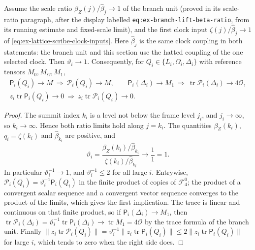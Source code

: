 \begin{lemma}
\label{lem:ex-lattice-scribe-normalization-ratio}
Assume the scale ratio $\beta_Z(j)/\widehat\beta_j\to1$ of the branch
unit (proved in its scale-ratio paragraph, after the display labelled
\texttt{eq:ex-branch-lift-beta-ratio}, from its running estimate and
fixed-scale limit), and the first clock input
$\zeta(j)/\widehat\beta_j\to1$ of
\eqref{eq:ex-lattice-scribe-clock-inputs}. Here $\widehat\beta_j$ is the
same clock coupling in both statements: the branch unit and this section
use the hatted coupling of the one selected clock. Then $\vartheta_i\to1$.
Consequently, for $Q_i\in\{L_i,\Omega_i,\Delta_i\}$ with reference
tensors $M_0,M_\Omega,M_1$,
\begin{gather*}
 \mathsf P_i(Q_i)\to M\ \Longrightarrow\ \mathcal P_i(Q_i)\to M,
 \qquad
 \mathsf P_i(\Delta_i)\to M_1\ \Longrightarrow\
 \operatorname{tr}\mathcal P_i(\Delta_i)\to4\mathcal O,\\
 z_i\operatorname{tr}\mathsf P_i(Q_i)\to0\ \Longrightarrow\
 z_i\operatorname{tr}\mathcal P_i(Q_i)\to0 .
\end{gather*}
\end{lemma}
\begin{proof}
The summit index $k_i$ is a level not below the frame level $j_i$, and
$j_i\to\infty$, so $k_i\to\infty$. Hence both ratio limits hold along
$j=k_i$. The quantities $\beta_Z(k_i)$, $q_i=\zeta(k_i)$ and
$\widehat\beta_{k_i}$ are positive, and
\[
 \vartheta_i=\frac{\beta_Z(k_i)/\widehat\beta_{k_i}}
               {\zeta(k_i)/\widehat\beta_{k_i}}
 \longrightarrow\frac11=1 .
\]
In particular $\vartheta_i^{-1}\to1$, and $\vartheta_i^{-1}\le2$ for all
large $i$. Entrywise, $\mathcal P_i(Q_i)=\vartheta_i^{-1}\mathsf P_i(Q_i)$
in the finite product of copies of $\mathcal F_4^0$; the product of a
convergent scalar sequence and a convergent vector sequence converges to
the product of the limits, which gives the first implication. The trace is
linear and continuous on that finite product, so
if $\mathsf P_i(\Delta_i)\to M_1$, then
$\operatorname{tr}\mathcal P_i(\Delta_i)=\vartheta_i^{-1}
\operatorname{tr}\mathsf P_i(\Delta_i)\to\operatorname{tr}M_1
=4\mathcal O$ by the trace formula of the branch unit. Finally
$\|z_i\operatorname{tr}\mathcal P_i(Q_i)\|
=\vartheta_i^{-1}\|z_i\operatorname{tr}\mathsf P_i(Q_i)\|
\le2\|z_i\operatorname{tr}\mathsf P_i(Q_i)\|$ for large $i$, which tends
to zero when the right side does.
\end{proof}

